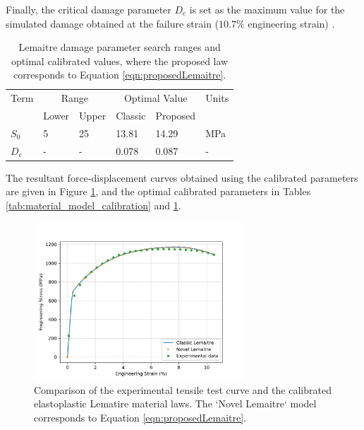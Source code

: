 \documentclass[sn-mathphys,Numbered]{sn-jnl}%
\begin{document}
Finally, the critical damage parameter $D_c$ is set as the maximum value for the simulated damage obtained at the failure strain ($10.7 \%$ engineering strain) \cite{malcher_continuum_2012}.
\begin{table}[htb]
	\centering
		\begin{tabular}{llllll} \hline
			Term  & \multicolumn{2}{c}{Range} & \multicolumn{2}{c}{Optimal Value} & Units \\ 
				  & Lower & Upper & Classic & Proposed &  \\ \hline 
			$S_0$ & 5 & 25 & 13.81 & 14.29 & MPa \\
			$D_c$ & - & - & 0.078 & 0.087 & - \\
			\hline
		\end{tabular}
	\caption{Lemaitre damage parameter search ranges and optimal calibrated values, where the proposed law corresponds to Equation \ref{eqn:proposedLemaitre}.}
	\label{tab:material_model_calibration_lemaitre}
\end{table}

The resultant force-displacement curves obtained using the calibrated parameters are given in Figure \ref{fig:calibrated_tensile_test}, and the optimal calibrated parameters in Tables \ref{tab:material_model_calibration} and \ref{tab:material_model_calibration_lemaitre}.
\begin{figure}[htb]
\begin{center}
	\includegraphics[width=0.7\textwidth]{./Figures/SimulationAndAnalysis/compareExperimentalSimulation/compareAllLemaitreExp.png}
	\caption{Comparison of the experimental tensile test curve and the calibrated elastoplastic Lematire material laws. The `Novel Lemaitre` model corresponds to Equation \ref{eqn:proposedLemaitre}.}
	\label{fig:calibrated_tensile_test}
\end{center}
\end{figure}
\end{document}
